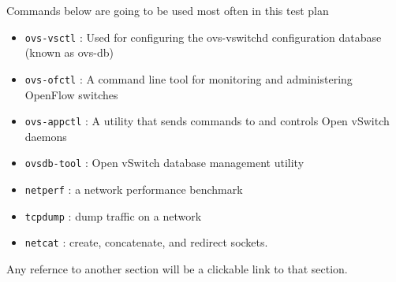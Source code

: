 \documentclass[letter]{article}
\begin{document}
Commands below are going to be used most often in this test plan
\begin{itemize}
\item \texttt{ovs-vsctl} : Used for configuring the ovs-vswitchd configuration database (known as ovs-db) 
\item \texttt{ovs-ofctl} : A command line tool for monitoring and administering OpenFlow switches 
\item \texttt{ovs-appctl} : A utility that sends commands to and controls Open vSwitch daemons 
\item \texttt{ovsdb-tool} : Open vSwitch database management utility
\item \texttt{netperf} : a network performance benchmark
\item \texttt{tcpdump} : dump traffic on a network
\item \texttt{netcat} : create, concatenate, and redirect sockets. 
\end{itemize}

Any refernce to another section will be a clickable link to that section.

\end{document}
